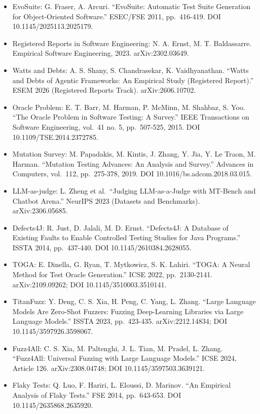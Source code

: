 \documentclass[
  11pt,
]{article}
\providecommand{\tightlist}{%
  \setlength{\itemsep}{0pt}\setlength{\parskip}{0pt}}
\begin{document}
\begin{itemize}
  \begin{enumerate}
  \def\labelenumi{\arabic{enumi}.}
  \setcounter{enumi}{2024}
  \tightlist
  \item
    arXiv:2503.14713.
  \end{enumerate}
\item
  EvoSuite: G. Fraser, A. Arcuri. ``EvoSuite: Automatic Test Suite
  Generation for Object-Oriented Software.'' ESEC/FSE 2011, pp.~416-419.
  DOI 10.1145/2025113.2025179.
\item
  Registered Reports in Software Engineering: N. A. Ernst, M. T.
  Baldassarre. Empirical Software Engineering, 2023. arXiv:2302.03649.
\item
  Watts and Debts: A. S. Shany, S. Chandrasekar, K. Vaidhyanathan.
  ``Watts and Debts of Agentic Frameworks: An Empirical Study
  (Registered Report).'' ESEM 2026 (Registered Reports Track).
  arXiv:2606.10702.
\item
  Oracle Problem: E. T. Barr, M. Harman, P. McMinn, M. Shahbaz, S. Yoo.
  ``The Oracle Problem in Software Testing: A Survey.'' IEEE
  Transactions on Software Engineering, vol.~41 no. 5, pp.~507-525,
  2015. DOI 10.1109/TSE.2014.2372785.
\item
  Mutation Survey: M. Papadakis, M. Kintis, J. Zhang, Y. Jia, Y. Le
  Traon, M. Harman. ``Mutation Testing Advances: An Analysis and
  Survey.'' Advances in Computers, vol.~112, pp.~275-378, 2019. DOI
  10.1016/bs.adcom.2018.03.015.
\item
  LLM-as-judge: L. Zheng et al.~``Judging LLM-as-a-Judge with MT-Bench
  and Chatbot Arena.'' NeurIPS 2023 (Datasets and Benchmarks).
  arXiv:2306.05685.
\item
  Defects4J: R. Just, D. Jalali, M. D. Ernst. ``Defects4J: A Database of
  Existing Faults to Enable Controlled Testing Studies for Java
  Programs.'' ISSTA 2014, pp.~437-440. DOI 10.1145/2610384.2628055.
\item
  TOGA: E. Dinella, G. Ryan, T. Mytkowicz, S. K. Lahiri. ``TOGA: A
  Neural Method for Test Oracle Generation.'' ICSE 2022, pp.~2130-2141.
  arXiv:2109.09262; DOI 10.1145/3510003.3510141.
\item
  TitanFuzz: Y. Deng, C. S. Xia, H. Peng, C. Yang, L. Zhang. ``Large
  Language Models Are Zero-Shot Fuzzers: Fuzzing Deep-Learning Libraries
  via Large Language Models.'' ISSTA 2023, pp.~423-435.
  arXiv:2212.14834; DOI 10.1145/3597926.3598067.
\item
  Fuzz4All: C. S. Xia, M. Paltenghi, J. L. Tian, M. Pradel, L. Zhang.
  ``Fuzz4All: Universal Fuzzing with Large Language Models.'' ICSE 2024,
  Article 126. arXiv:2308.04748; DOI 10.1145/3597503.3639121.
\item
  Flaky Tests: Q. Luo, F. Hariri, L. Eloussi, D. Marinov. ``An Empirical
  Analysis of Flaky Tests.'' FSE 2014, pp.~643-653. DOI
  10.1145/2635868.2635920.
\end{itemize}
\end{document}
